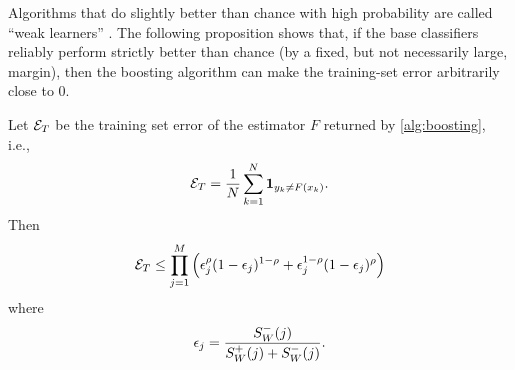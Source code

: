  Algorithms that  
 do slightly better than chance with high probability are called ``weak learners'' \cite{schapire1990strength}. The following proposition \citep{freund1997decision-theoretic} shows that, if the base classifiers reliably perform strictly better than chance (by a fixed, but not necessarily large, margin), then the boosting algorithm can make the training-set error arbitrarily close to 0.
 
\begin{proposition}
\label{prop:boosting}
Let ${\mathcal E}_T$ be the training set error of the  estimator $F$ returned by \cref{alg:boosting}, i.e., 
\[
{\mathcal E}_T = \frac1N  \sum_{k=1}^N {\bm 1}_{y_k\neq F(x_k)}.
\]
 Then
\[
{\mathcal E}_T \leq \prod_{j=1}^M \Big(\epsilon_j^\rho(1-\epsilon_j)^{1-\rho} + \epsilon_j^{1-\rho}(1-\epsilon_j)^{\rho}\Big)
\]
where
\[
\epsilon_j =  \frac{S_W^-(j)}{S_W^+(j)+S_W^-(j)}.
\]
\end{proposition}
